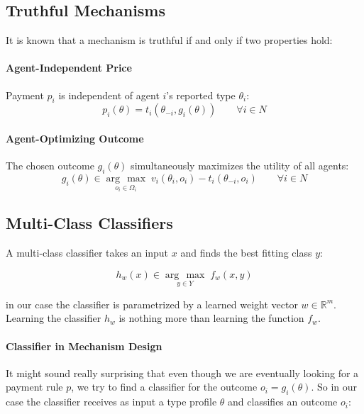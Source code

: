 \documentclass[]{article}
\newcommand{\argmax}[1]{\underset{#1}{\operatorname{arg}\,\operatorname{max}}\;}
\begin{document}
\subsection{Truthful Mechanisms}
It is known that a mechanism is truthful if and only if two properties hold:

\paragraph{Agent-Independent Price}
Payment $p_{i}$ is independent of agent $i$'s reported type $\theta_{i}$:
\begin{equation*}
p_{i}(\theta) = t_{i}(\theta_{-i}, g_{i}(\theta)) \quad \quad \forall i \in N
\end{equation*}


\paragraph{Agent-Optimizing Outcome} 
The chosen outcome $g_{i}(\theta)$ simultaneously maximizes the utility of all agents:
\begin{equation*}
g_{i}(\theta) \in \argmax{o_{i} \in \Omega_{i}} v_{i}(\theta_{i}, o_{i}) - t_{i}(\theta_{-i}, o_{i}) \quad \quad \forall i \in N
\end{equation*}

\subsection{Multi-Class Classifiers}

A multi-class classifier takes an input $x$ and finds the best fitting class $y$:

\begin{equation*}
h_{w}(x) \in \argmax{y \in Y} f_{w}(x,y)
\end{equation*}

\noindent in our case the classifier is parametrized by a learned weight vector $w \in \mathbb{R}^{m}$.
Learning the classifier $h_{w}$ is nothing more than learning the function $f_{w}$.

\paragraph{Classifier in Mechanism Design} It might sound really surprising that even though we are eventually looking for a payment rule $p$, we try to find a classifier for the outcome $o_{i} = g_{i}(\theta)$. So in our case the classifier receives as input a type profile  $\theta$ and classifies an outcome $o_{i}$:
\end{document}
